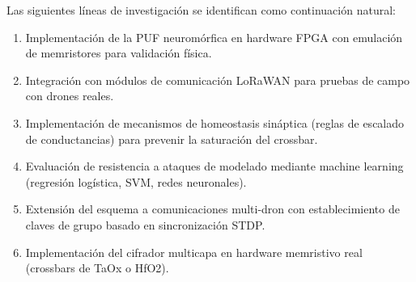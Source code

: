 Las siguientes líneas de investigación se identifican como continuación natural:

\begin{enumerate}
    \item Implementación de la PUF neuromórfica en hardware FPGA con emulación de memristores para validación física.
    \item Integración con módulos de comunicación LoRaWAN para pruebas de campo con drones reales.
    \item Implementación de mecanismos de homeostasis sináptica (reglas de escalado de conductancias) para prevenir la saturación del crossbar.
    \item Evaluación de resistencia a ataques de modelado mediante machine learning (regresión logística, SVM, redes neuronales).
    \item Extensión del esquema a comunicaciones multi-dron con establecimiento de claves de grupo basado en sincronización STDP.
    \item Implementación del cifrador multicapa en hardware memristivo real (crossbars de TaOx o HfO2).
\end{enumerate}
